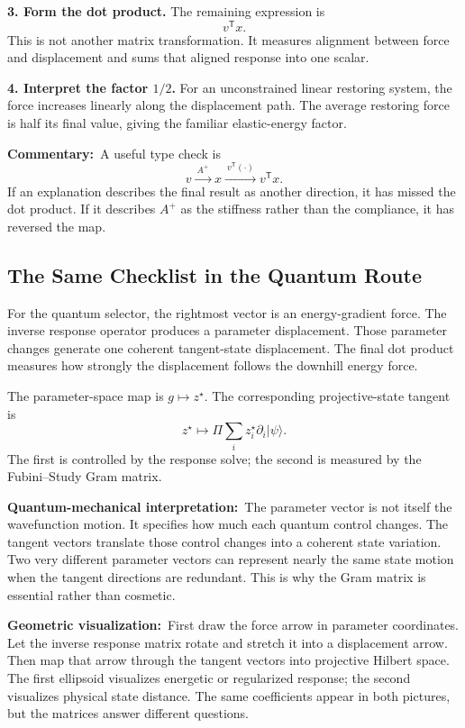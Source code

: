\documentclass[10pt,twocolumn]{article}
\newcommand{\ket}[1]{|#1\rangle}
\newcommand{\commentary}[1]{\par\noindent\textbf{Commentary:}\ #1\par}
\newcommand{\phys}[1]{\par\noindent\textbf{Quantum-mechanical interpretation:}\ #1\par}
\newcommand{\geom}[1]{\par\noindent\textbf{Geometric visualization:}\ \textcolor{teal!70!black}{#1}\par}
\begin{document}
\textbf{3. Form the dot product.}
The remaining expression is
\[
v^{\mathsf T}x.
\]
This is not another matrix transformation. It measures alignment between force
and displacement and sums that aligned response into one scalar.

\textbf{4. Interpret the factor \(1/2\).}
For an unconstrained linear restoring system, the force increases linearly
along the displacement path. The average restoring force is half its final
value, giving the familiar elastic-energy factor.

\commentary{A useful type check is
\[
v\xrightarrow{\ A^+\ }x
\xrightarrow{\ v^{\mathsf T}(\cdot)\ }v^{\mathsf T}x.
\]
If an explanation describes the final result as another direction, it has
missed the dot product. If it describes \(A^+\) as the stiffness rather than
the compliance, it has reversed the map.}

\subsection*{The Same Checklist in the Quantum Route}

For the quantum selector, the rightmost vector is an energy-gradient force.
The inverse response operator produces a parameter displacement. Those
parameter changes generate one coherent tangent-state displacement. The final
dot product measures how strongly the displacement follows the downhill
energy force.

The parameter-space map is \(g\mapsto z^\star\). The corresponding
projective-state tangent is
\[
z^\star\longmapsto
\Pi\sum_i z_i^\star\partial_i\ket{\psi}.
\]
The first is controlled by the response solve; the second is measured by the
Fubini--Study Gram matrix.

\phys{The parameter vector is not itself the wavefunction motion. It specifies
how much each quantum control changes. The tangent vectors translate those
control changes into a coherent state variation. Two very different parameter
vectors can represent nearly the same state motion when the tangent directions
are redundant. This is why the Gram matrix is essential rather than cosmetic.}

\geom{First draw the force arrow in parameter coordinates. Let the inverse
response matrix rotate and stretch it into a displacement arrow. Then map that
arrow through the tangent vectors into projective Hilbert space. The first
ellipsoid visualizes energetic or regularized response; the second visualizes
physical state distance. The same coefficients appear in both pictures, but
the matrices answer different questions.}
\end{document}
